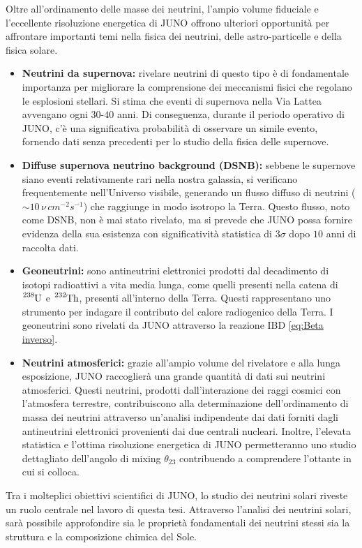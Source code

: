 Oltre all'ordinamento delle masse dei neutrini, l'ampio volume fiduciale e l'eccellente risoluzione energetica di JUNO offrono ulteriori opportunità per affrontare importanti temi nella fisica dei neutrini, delle astro-particelle e della fisica solare.
\begin{itemize}
    \item \textbf{Neutrini da supernova:} rivelare neutrini di questo tipo è di fondamentale importanza per migliorare la comprensione dei meccanismi fisici che regolano le esplosioni stellari. Si stima che eventi di supernova nella Via Lattea avvengano ogni $30$-$40$ anni.  Di conseguenza, durante il periodo operativo di JUNO, c'è una significativa probabilità di osservare un simile evento, fornendo dati senza precedenti per lo studio della fisica delle supernove.
    \item \textbf{Diffuse supernova neutrino background (DSNB):} sebbene le supernove siano eventi relativamente rari nella nostra galassia, si verificano frequentemente nell'Universo visibile, generando un flusso diffuso di neutrini ($\sim10\,\nu\,\unit{cm^{-2}s^{-1}}$) che raggiunge in modo isotropo la Terra. Questo flusso, noto come DSNB, non è mai stato rivelato, ma si prevede che JUNO possa fornire evidenza della sua esistenza con significatività statistica di $3\sigma$ dopo $10$ anni di raccolta dati.
    \item \textbf{Geoneutrini:} sono antineutrini elettronici prodotti dal decadimento di isotopi radioattivi a vita media lunga, come quelli presenti nella catena di $\ce{^{238}U}$ e $\ce{^{232}Th}$, presenti all'interno della Terra. Questi rappresentano uno strumento per indagare il contributo del calore radiogenico della Terra. I geoneutrini sono rivelati da JUNO attraverso la reazione IBD \ref{eq:Beta inverso}.
    \item \textbf{Neutrini atmosferici:} grazie all'ampio volume del rivelatore e alla lunga esposizione, JUNO raccoglierà una grande quantità di dati sui neutrini atmosferici. Questi neutrini, prodotti dall'interazione dei raggi cosmici con l'atmosfera terrestre, contribuiscono alla determinazione dell'ordinamento di massa dei neutrini attraverso un'analisi indipendente dai dati forniti dagli antineutrini elettronici provenienti dai due centrali nucleari. Inoltre, l'elevata statistica e l'ottima risoluzione energetica di JUNO permetteranno uno studio dettagliato dell'angolo di mixing $\theta_{23}$ contribuendo a comprendere l'ottante in cui si colloca.
\end{itemize}
Tra i molteplici obiettivi scientifici di JUNO, lo studio dei neutrini solari riveste un ruolo centrale nel lavoro di questa tesi.  Attraverso l'analisi dei neutrini solari, sarà possibile approfondire sia le proprietà fondamentali dei neutrini stessi sia la struttura e la composizione chimica del Sole.
